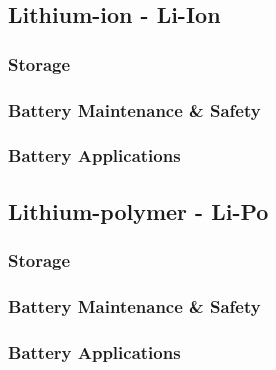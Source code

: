 \documentclass[a4paper,11pt, twocolumn]{article}
\begin{document}
\subsection{Lithium-ion - Li-Ion}

\subsubsection{Storage}

\subsubsection{Battery Maintenance \& Safety}

\subsubsection{Battery Applications}


\subsection{Lithium-polymer - Li-Po}

\subsubsection{Storage}

\subsubsection{Battery Maintenance \& Safety}

\subsubsection{Battery Applications}


\newpage
\onecolumn


\end{document}
